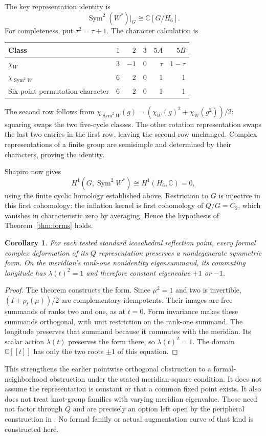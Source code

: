 \documentclass[11pt]{article}
\newtheorem{corollary}[theorem]{Corollary}
\newcommand{\Sym}{\operatorname{Sym}}
\newcommand{\C}{\mathbb C}
\begin{document}
The key representation identity is
\[
              \Sym^2(W^*)\big|_G\cong\C[G/H_6].
\]
For completeness, put $\tau^2=\tau+1$. The character calculation is
\begin{center}
\begin{tabular}{lrrrrr}
\toprule
Class & $1$ & $2$ & $3$ & $5A$ & $5B$\\
\midrule
$\chi_W$ &3&$-1$&0&$\tau$&$1-\tau$\\
$\chi_{\Sym^2 W}$ &6&2&0&1&1\\
Six-point permutation character &6&2&0&1&1\\
\bottomrule
\end{tabular}
\end{center}
The second row follows from
$\chi_{\Sym^2 W}(g)=(\chi_W(g)^2+\chi_W(g^2))/2$; squaring swaps
the two five-cycle classes. The other rotation representation swaps
the last two entries in the first row, leaving the second row
unchanged. Complex representations of a finite group are semisimple
and determined by their characters, proving the identity.

Shapiro now gives
\[
 H^1(G,\Sym^2W^*)\cong H^1(H_6,\C)=0,
\]
using the finite cyclic homology established above. Restriction
to $G$ is injective in this first cohomology: the inflation kernel
is first cohomology of $Q/G=C_2$, which vanishes
in characteristic zero by averaging. Hence the hypothesis of
Theorem~\ref{thm:forms} holds.

\begin{corollary}\label{cor:peripheral}
For each tested standard icosahedral reflection point, every formal
complex deformation of its $Q$ representation preserves a
nondegenerate symmetric form. On the meridian's rank-one
nonidentity eigensummand, its commuting longitude has
$\lambda(t)^2=1$ and therefore constant eigenvalue $+1$ or $-1$.
\end{corollary}
\begin{proof}
The theorem constructs the form. Since $\mu^2=1$ and two is
invertible, $(I\pm\rho_t(\mu))/2$ are complementary idempotents.
Their images are free summands of ranks two and one, as at $t=0$.
Form invariance makes these summands orthogonal, with unit
restriction on the rank-one summand. The longitude preserves that
summand because it commutes with the meridian. Its scalar action
$\lambda(t)$ preserves the form there, so $\lambda(t)^2=1$.
The domain $\C[[t]]$ has only the two roots $\pm1$ of this equation.
\end{proof}

This strengthens the earlier pointwise orthogonal obstruction to a
formal-neighborhood obstruction under the stated meridian-square
condition. It does not assume the representation is constant or
that a common fixed point exists. It also does not treat knot-group
families with varying meridian eigenvalue. Those need not factor
through $Q$ and are precisely an option left open by the peripheral
construction in \cite[Sections 2.3--2.4]{gglw}. No formal family
or actual augmentation curve of that kind is constructed here.
\end{document}
